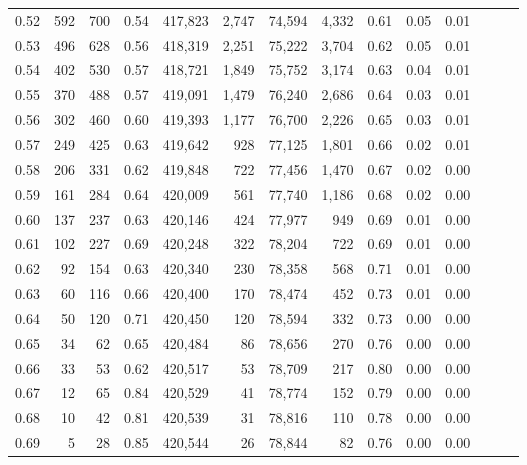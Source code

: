 \begin{tabular}{rrrrrrrrrrrrrr}
0.52 &     592 &    700 &  0.54 &  417,823 &    2,747 &  74,594 &   4,332 &  0.61 &  0.05 &      0.01 \\
0.53 &     496 &    628 &  0.56 &  418,319 &    2,251 &  75,222 &   3,704 &  0.62 &  0.05 &      0.01 \\
0.54 &     402 &    530 &  0.57 &  418,721 &    1,849 &  75,752 &   3,174 &  0.63 &  0.04 &      0.01 \\
0.55 &     370 &    488 &  0.57 &  419,091 &    1,479 &  76,240 &   2,686 &  0.64 &  0.03 &      0.01 \\
0.56 &     302 &    460 &  0.60 &  419,393 &    1,177 &  76,700 &   2,226 &  0.65 &  0.03 &      0.01 \\
0.57 &     249 &    425 &  0.63 &  419,642 &      928 &  77,125 &   1,801 &  0.66 &  0.02 &      0.01 \\
0.58 &     206 &    331 &  0.62 &  419,848 &      722 &  77,456 &   1,470 &  0.67 &  0.02 &      0.00 \\
0.59 &     161 &    284 &  0.64 &  420,009 &      561 &  77,740 &   1,186 &  0.68 &  0.02 &      0.00 \\
0.60 &     137 &    237 &  0.63 &  420,146 &      424 &  77,977 &     949 &  0.69 &  0.01 &      0.00 \\
0.61 &     102 &    227 &  0.69 &  420,248 &      322 &  78,204 &     722 &  0.69 &  0.01 &      0.00 \\
0.62 &      92 &    154 &  0.63 &  420,340 &      230 &  78,358 &     568 &  0.71 &  0.01 &      0.00 \\
0.63 &      60 &    116 &  0.66 &  420,400 &      170 &  78,474 &     452 &  0.73 &  0.01 &      0.00 \\
0.64 &      50 &    120 &  0.71 &  420,450 &      120 &  78,594 &     332 &  0.73 &  0.00 &      0.00 \\
0.65 &      34 &     62 &  0.65 &  420,484 &       86 &  78,656 &     270 &  0.76 &  0.00 &      0.00 \\
0.66 &      33 &     53 &  0.62 &  420,517 &       53 &  78,709 &     217 &  0.80 &  0.00 &      0.00 \\
0.67 &      12 &     65 &  0.84 &  420,529 &       41 &  78,774 &     152 &  0.79 &  0.00 &      0.00 \\
0.68 &      10 &     42 &  0.81 &  420,539 &       31 &  78,816 &     110 &  0.78 &  0.00 &      0.00 \\
0.69 &       5 &     28 &  0.85 &  420,544 &       26 &  78,844 &      82 &  0.76 &  0.00 &      0.00 \\

\end{tabular}
